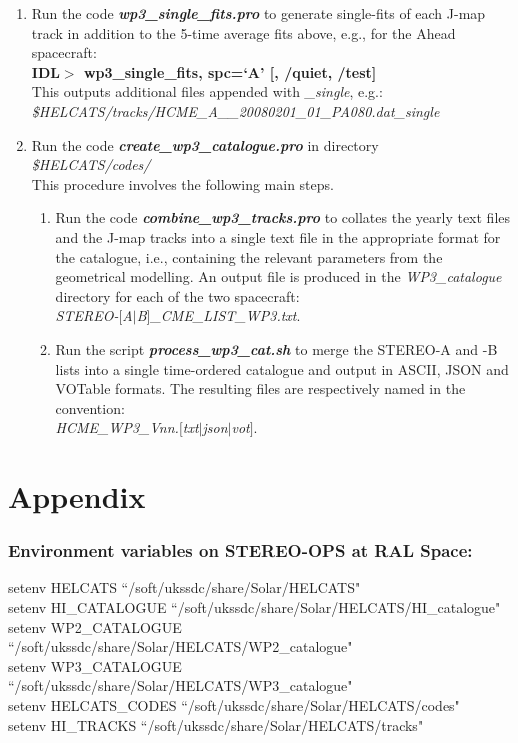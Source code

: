 \documentclass[12pt, a4paper, oneside]{article}
\begin{document}
\begin{enumerate}
\item Run the code {\bf \textit{wp3\_single\_fits.pro}} to generate single-fits of each J-map track in addition to the 5-time average fits above, e.g., for the Ahead spacecraft:\\
{\bf IDL$>$ wp3\_single\_fits, spc=`A' [, /quiet, /test]} \\
This outputs additional files appended with \textit{\_single}, e.g.:\\
\textit{\$HELCATS/tracks/HCME\_A\_\_20080201\_01\_PA080.dat\_single}


\item Run the code {\bf \textit{create\_wp3\_catalogue.pro}} in directory\\
	\textit{\$HELCATS/codes/} \\
	This procedure involves the following main steps.

	\begin{enumerate}
	\item Run the code {\bf \textit{combine\_wp3\_tracks.pro}} to collates the yearly text files and the J-map tracks into a single text file in the appropriate format for the catalogue, i.e., containing the relevant parameters from the geometrical modelling. An output file is produced in the \textit{WP3\_catalogue} directory for each of the two spacecraft:\\
	\textit{STEREO-$[$A$|$B$]$\_CME\_LIST\_WP3.txt}.

	\item Run the script {\bf \textit{process\_wp3\_cat.sh}} to merge the STEREO-A and -B lists into a single time-ordered catalogue and output in ASCII, JSON and VOTable formats. The resulting files are respectively named in the convention:\\ \textit{HCME\_WP3\_Vnn.$[$txt$|$json$|$vot$]$}.

	\end{enumerate}



\end{enumerate}



\vspace{1cm}

\section*{\sc Appendix}

\subsubsection*{\sc Environment variables on STEREO-OPS at RAL Space:}
setenv HELCATS ``/soft/ukssdc/share/Solar/HELCATS"
\\
setenv HI\_CATALOGUE ``/soft/ukssdc/share/Solar/HELCATS/HI\_catalogue"
\\
setenv WP2\_CATALOGUE ``/soft/ukssdc/share/Solar/HELCATS/WP2\_catalogue"
\\
setenv WP3\_CATALOGUE ``/soft/ukssdc/share/Solar/HELCATS/WP3\_catalogue"
\\
setenv HELCATS\_CODES ``/soft/ukssdc/share/Solar/HELCATS/codes"
\\
setenv HI\_TRACKS ``/soft/ukssdc/share/Solar/HELCATS/tracks"
\end{document}
